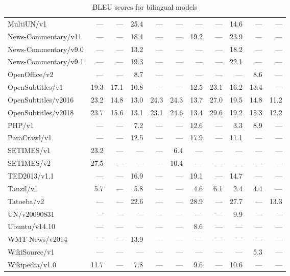\begin{table}[h]
\begin{tabular}{lrrrrrrrrrr}
MultiUN/v1           &  --- &  --- & 25.4 &  --- &  --- &  --- &  --- & 14.6 &  --- &  --- \\
News-Commentary/v11  &  --- &  --- & 18.4 &  --- &  --- & 19.2 &  --- & 23.9 &  --- &  --- \\
News-Commentary/v9.0 &  --- &  --- & 13.2 &  --- &  --- &  --- &  --- & 18.2 &  --- &  --- \\
News-Commentary/v9.1 &  --- &  --- & 19.3 &  --- &  --- &  --- &  --- & 22.1 &  --- &  --- \\
OpenOffice/v2        &  --- &  --- &  8.7 &  --- &  --- &  --- &  --- &  --- &  8.6 &  --- \\
OpenSubtitles/v1     & 19.3 & 17.1 & 10.8 &  --- &  --- & 12.5 & 23.1 & 16.2 & 13.4 &  --- \\
OpenSubtitles/v2016  & 23.2 & 14.8 & 13.0 & 24.3 & 24.3 & 13.7 & 27.0 & 19.5 & 14.8 & 11.2 \\
OpenSubtitles/v2018  & 23.7 & 15.6 & 13.1 & 23.1 & 24.6 & 13.4 & 29.6 & 19.2 & 15.3 & 12.2 \\
PHP/v1               &  --- &  --- &  7.2 &  --- &  --- & 12.6 &  --- &  3.3 &  8.9 &  --- \\
ParaCrawl/v1         &  --- &  --- & 12.5 &  --- &  --- & 17.9 &  --- & 11.1 &  --- &  --- \\
SETIMES/v1           & 23.2 &  --- &  --- &  --- &  6.4 &  --- &  --- &  --- &  --- &  --- \\
SETIMES/v2           & 27.5 &  --- &  --- &  --- & 10.4 &  --- &  --- &  --- &  --- &  --- \\
TED2013/v1.1         &  --- &  --- & 16.9 &  --- &  --- & 19.1 &  --- & 14.7 &  --- &  --- \\
Tanzil/v1            &  5.7 &  --- &  5.8 &  --- &  --- &  4.6 &  6.1 &  2.4 &  4.4 &  --- \\
Tatoeba/v2           &  --- &  --- & 22.6 &  --- &  --- & 28.9 &  --- & 27.7 &  --- & 13.3 \\
UN/v20090831         &  --- &  --- &  --- &  --- &  --- &  --- &  --- &  9.9 &  --- &  --- \\
Ubuntu/v14.10        &  --- &  --- &  --- &  --- &  --- &  8.6 &  --- &  --- &  --- &  --- \\
WMT-News/v2014       &  --- &  --- & 13.9 &  --- &  --- &  --- &  --- &  --- &  --- &  --- \\
WikiSource/v1        &  --- &  --- &  --- &  --- &  --- &  --- &  --- &  --- &  5.3 &  --- \\
Wikipedia/v1.0       & 11.7 &  --- &  7.8 &  --- &  --- &  9.6 &  --- & 10.6 &  --- &  --- \\
\bottomrule
\end{tabular}

\caption{BLEU scores for bilingual models}
\label{table:bilingual-results}
\end{table}


